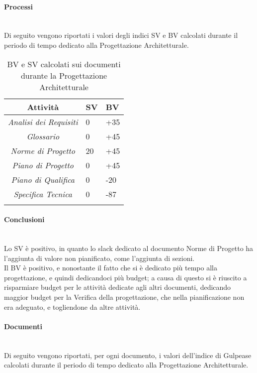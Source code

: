 \paragraph{Processi} \hfill\\
Di seguito vengono riportati i valori degli indici SV e BV calcolati durante il periodo di tempo dedicato alla Progettazione Architetturale.
\begin{longtable}{|c|p{3cm}|p{3cm}|}
\toprule
\textbf{Attività} & \textbf{SV} & \textbf{BV} \\


\midrule
\emph{Analisi dei Requisiti} & 0 & +35\\
\midrule
\emph{Glossario} & 0  & +45\\
\midrule
\emph{Norme di Progetto} & 20 & +45\\
\midrule
\emph{Piano di Progetto} & 0 & +45 \\
\midrule
\emph{Piano di Qualifica} & 0 & -20\\
\midrule
\emph{Specifica Tecnica} & 0 & -87\\
\bottomrule
\caption{BV e SV calcolati sui documenti durante la Progettazione Architetturale}
\label{tab:changelog}
\end{longtable}

\paragraph{Conclusioni} \hfill\\
Lo SV è positivo, in quanto lo slack dedicato al documento Norme di Progetto ha  l'aggiunta di valore non pianificato, come l'aggiunta di sezioni.\\
Il BV è positivo, e nonostante il fatto che si è dedicato più tempo alla progettazione, e quindi dedicandoci più budget; a causa di questo si è riuscito a risparmiare budget per le attività dedicate agli altri documenti, dedicando maggior budget per la Verifica della progettazione, che nella pianificazione non era adeguato, e togliendone da altre attività.

\paragraph{Documenti} \hfill\\
Di seguito vengono riportati, per ogni documento, i valori dell'indice di Gulpease calcolati durante il periodo di tempo dedicato alla Progettazione Architetturale.

